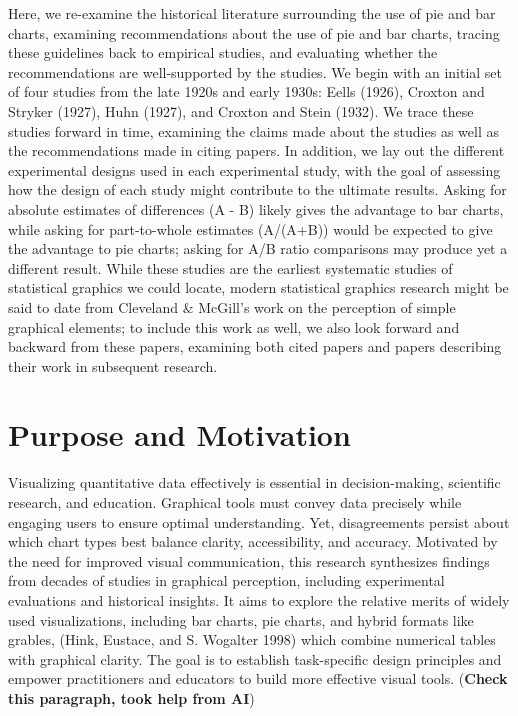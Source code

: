 \documentclass[
  10pt,
  letterpaper,
  twocolumn]{article}
\newcommand{\svp}[1]{{\textcolor{RedOrange}{#1}}}
\begin{document}
\svp{Here, we re-examine the historical literature surrounding the use
of pie and bar charts, examining recommendations about the use of pie
and bar charts, tracing these guidelines back to empirical studies, and
evaluating whether the recommendations are well-supported by the
studies.} \svp{We begin with an initial set of four studies from the
late 1920s and early 1930s: Eells (1926), Croxton and Stryker (1927),
Huhn (1927), and Croxton and Stein (1932).} \svp{We trace these studies
forward in time, examining the claims made about the studies as well as
the recommendations made in citing papers.} \svp{In addition, we lay out
the different experimental designs used in each experimental study, with
the goal of assessing how the design of each study might contribute to
the ultimate results. Asking for absolute estimates of differences (A -
B) likely gives the advantage to bar charts, while asking for
part-to-whole estimates (A/(A+B)) would be expected to give the
advantage to pie charts; asking for A/B ratio comparisons may produce
yet a different result.} \svp{While these studies are the earliest
systematic studies of statistical graphics we could locate, modern
statistical graphics research might be said to date from Cleveland \&
McGill's work on the perception of simple graphical elements; to include
this work as well, we also look forward and backward from these papers,
examining both cited papers and papers describing their work in
subsequent research.}

\hypertarget{purpose-and-motivation}{%
\section{Purpose and Motivation}\label{purpose-and-motivation}}

Visualizing quantitative data effectively is essential in
decision-making, scientific research, and education. Graphical tools
must convey data precisely while engaging users to ensure optimal
understanding. Yet, disagreements persist about which chart types best
balance clarity, accessibility, and accuracy. Motivated by the need for
improved visual communication, this research synthesizes findings from
decades of studies in graphical perception, including experimental
evaluations and historical insights. It aims to explore the relative
merits of widely used visualizations, including bar charts, pie charts,
and hybrid formats like grables, (Hink, Eustace, and S. Wogalter 1998)
which combine numerical tables with graphical clarity. The goal is to
establish task-specific design principles and empower practitioners and
educators to build more effective visual tools. (\textbf{Check this
paragraph, took help from AI})
\end{document}
